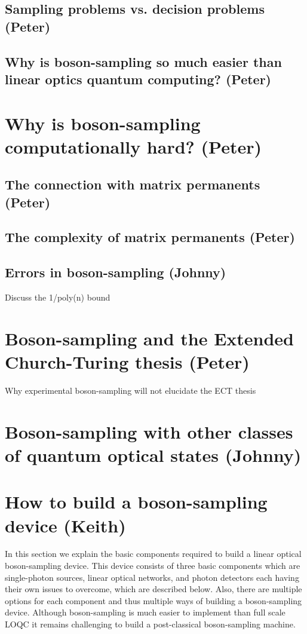 \documentclass[aps,pra,twocolumn,amsmath,amssymb,nofootinbib,superscriptaddress]{revtex4}
\begin{document}
\subsection{Sampling problems vs. decision problems (Peter)}

\subsection{Why is boson-sampling so much easier than linear optics quantum computing? (Peter)}

\section{Why is boson-sampling computationally hard? (Peter)}

\subsection{The connection with matrix permanents (Peter)}

\subsection{The complexity of matrix permanents (Peter)}

\subsection{Errors in boson-sampling (Johnny)}
Discuss the 1/poly(n) bound

\section{Boson-sampling and the Extended Church-Turing thesis (Peter)}
Why experimental boson-sampling will not elucidate the ECT thesis

\section{Boson-sampling with other classes of quantum optical states (Johnny)}

\section{How to build a boson-sampling device (Keith)}

In this section we explain the basic components required to build a linear optical boson-sampling device. This device consists of three basic components which are single-photon sources, linear optical networks, and photon detectors each having their own issues to overcome, which are described below. Also, there are multiple options for each component and thus multiple ways of building a boson-sampling device. Although boson-sampling is much easier to implement than full scale LOQC it remains  challenging to build a post-classical boson-sampling machine. 
\end{document}
